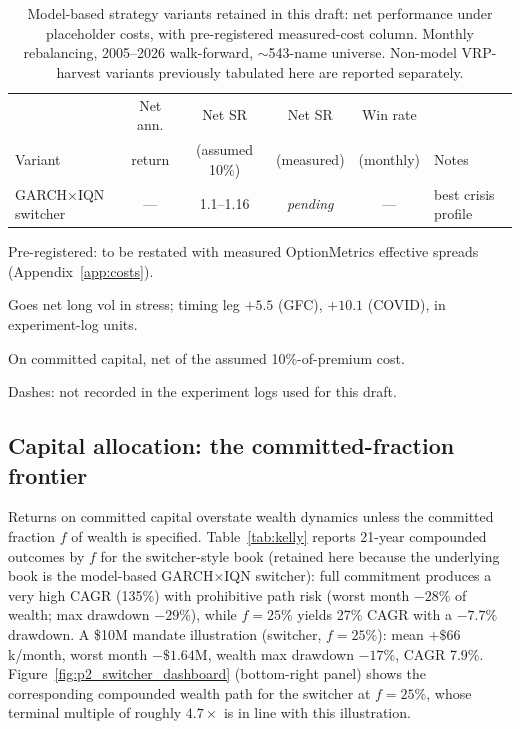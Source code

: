 \documentclass[11pt]{article}
\newcommand{\pending}{\multicolumn{1}{c}{\textit{pending}}}
\begin{document}
\begin{table}[t]
\centering
\begin{threeparttable}
\caption{Model-based strategy variants retained in this draft: net performance under placeholder costs, with pre-registered measured-cost column. Monthly rebalancing, 2005--2026 walk-forward, $\sim$543-name universe. Non-model VRP-harvest variants previously tabulated here are reported separately.}
\label{tab:strategies}
\footnotesize
\setlength{\tabcolsep}{3.5pt}
\begin{tabular}{lccccl}
\toprule
 & Net ann. & Net SR & Net SR & Win rate & \\
Variant & return\tnote{c} & (assumed 10\%) & (measured)\tnote{a} & (monthly) & Notes \\
\midrule
GARCH$\times$IQN switcher & --- & 1.1--1.16 & \pending & --- & best crisis profile\tnote{b} \\
\bottomrule
\end{tabular}
\begin{tablenotes}\footnotesize
\item[a] Pre-registered: to be restated with measured OptionMetrics effective spreads (Appendix~\ref{app:costs}).
\item[b] Goes net long vol in stress; timing leg $+5.5$ (GFC), $+10.1$ (COVID), in experiment-log units.
\item[c] On committed capital, net of the assumed 10\%-of-premium cost.
\item Dashes: not recorded in the experiment logs used for this draft.
\end{tablenotes}
\end{threeparttable}
\end{table}

\subsection{Capital allocation: the committed-fraction frontier}\label{app:kelly}
Returns on committed capital overstate wealth dynamics unless the committed fraction $f$ of wealth is specified. Table~\ref{tab:kelly} reports 21-year compounded outcomes by $f$ for the switcher-style book (retained here because the underlying book is the model-based GARCH$\times$IQN switcher): full commitment produces a very high CAGR (135\%) with prohibitive path risk (worst month $-28\%$ of wealth; max drawdown $-29\%$), while $f=25\%$ yields 27\% CAGR with a $-7.7\%$ drawdown. A \$10M mandate illustration (switcher, $f=25\%$): mean $+\$66$k/month, worst month $-\$1.64$M, wealth max drawdown $-17\%$, CAGR 7.9\%. Figure~\ref{fig:p2_switcher_dashboard} (bottom-right panel) shows the corresponding compounded wealth path for the switcher at $f=25\%$, whose terminal multiple of roughly $4.7\times$ is in line with this illustration.
\end{document}
